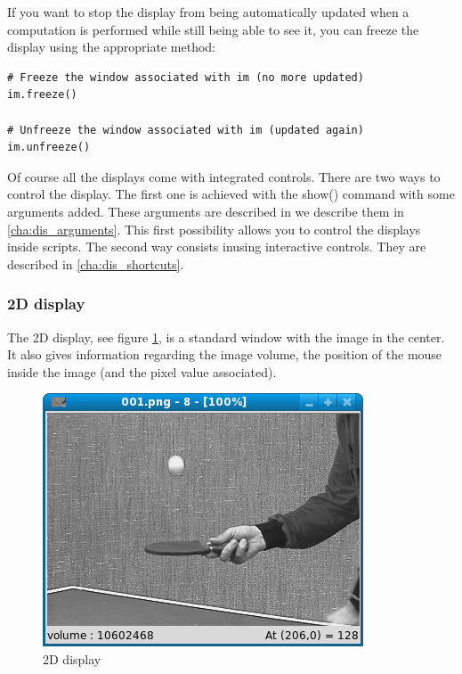 \documentclass[a4paper,10pt,oneside]{article}
\begin{document}
If you want to stop the display from being automatically updated when a 
computation is performed while still being able to see it, you can freeze the 
display using the appropriate method:

\lstset{language=Python}
\begin{lstlisting}
# Freeze the window associated with im (no more updated)
im.freeze()

# Unfreeze the window associated with im (updated again)
im.unfreeze()
\end{lstlisting}

Of course all the displays come with integrated controls. There are two ways to control
the display. The first one is achieved with the show() command with some arguments
added. These arguments are described in  we describe them in \ref{cha:dis_arguments}. This
first possibility allows you to control the displays inside scripts. The second way
consists inusing interactive controls. They are described in \ref{cha:dis_shortcuts}.

\subsubsection{2D display}

The 2D display, see figure \ref{fig:dis2D}, is a standard window with the image
in the center. It also gives information regarding the image volume, the position of
the mouse inside the image (and the pixel value associated).

\begin{figure}
\centering
\includegraphics[scale=0.5]{images/dis2D.png}
\caption{2D display}
\label{fig:dis2D}
\end{figure}
\end{document}
